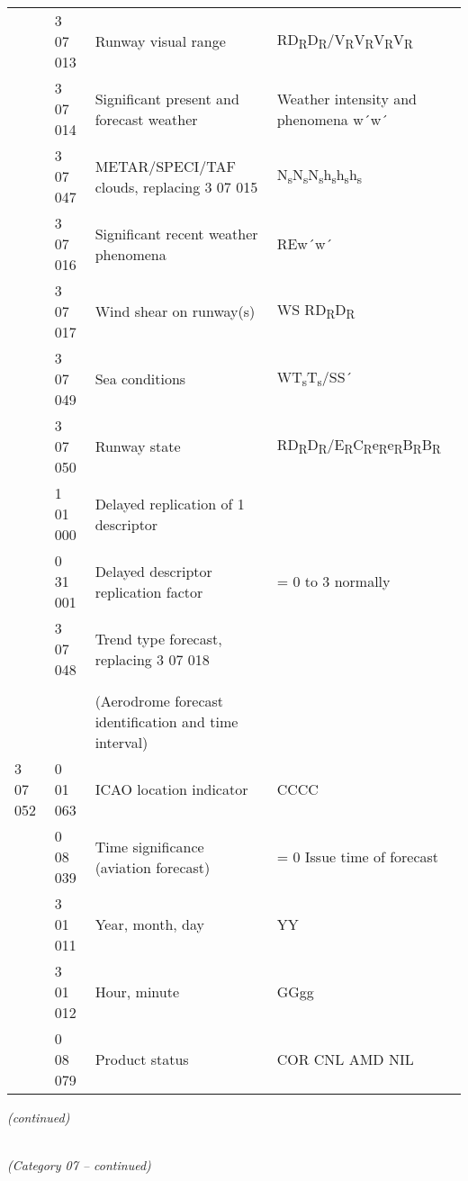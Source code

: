 \begin{longtable}[]{@{}llll@{}}
& 3 07 013 & Runway visual range & RD\textsubscript{R}D\textsubscript{R}/V\textsubscript{R}V\textsubscript{R}V\textsubscript{R}V\textsubscript{R}\tabularnewline
& 3 07 014 & Significant present and forecast weather & Weather intensity and phenomena w´w´\tabularnewline
& 3 07 047 & METAR/SPECI/TAF clouds, replacing 3 07 015 & N\textsubscript{s}N\textsubscript{s}N\textsubscript{s}h\textsubscript{s}h\textsubscript{s}h\textsubscript{s}\tabularnewline
& 3 07 016 & Significant recent weather phenomena & REw´w´\tabularnewline
& 3 07 017 & Wind shear on runway(s) & WS RD\textsubscript{R}D\textsubscript{R}\tabularnewline
& 3 07 049 & Sea conditions & WT\textsubscript{s}T\textsubscript{s}/SS´\tabularnewline
& 3 07 050 & Runway state & RD\textsubscript{R}D\textsubscript{R}/E\textsubscript{R}C\textsubscript{R}e\textsubscript{R}e\textsubscript{R}B\textsubscript{R}B\textsubscript{R}\tabularnewline
& 1 01 000 & Delayed replication of 1 descriptor &\tabularnewline
& 0 31 001 & Delayed descriptor replication factor & = 0 to 3 normally\tabularnewline
& 3 07 048 & Trend type forecast, replacing 3 07 018 &\tabularnewline
& & &\tabularnewline
& & (Aerodrome forecast identification and time interval) &\tabularnewline
3 07 052 & 0 01 063 & ICAO location indicator & CCCC\tabularnewline
& 0 08 039 & Time significance (aviation forecast) & = 0 Issue time of forecast\tabularnewline
& 3 01 011 & Year, month, day & YY\tabularnewline
& 3 01 012 & Hour, minute & GGgg\tabularnewline
& 0 08 079 & Product status & COR CNL AMD NIL\tabularnewline
\bottomrule
\end{longtable}

\emph{(continued)}

\emph{\\
(Category 07 -- continued)}

